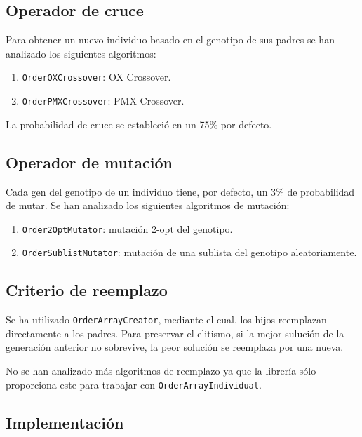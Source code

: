 \documentclass[a4paper,12pt,titlepage]{article}
\begin{document}
\subsection{Operador de cruce}

Para obtener un nuevo individuo basado en el genotipo de sus padres se han analizado los siguientes algoritmos:

\begin{enumerate}[noitemsep]
	\item \lstinline|OrderOXCrossover|: OX Crossover. 
	\item \lstinline|OrderPMXCrossover|: PMX Crossover.
\end{enumerate}

La probabilidad de cruce se estableció en un 75\% por defecto.

\subsection{Operador de mutación}

Cada gen del genotipo de un individuo tiene, por defecto, un 3\% de probabilidad de mutar. Se han analizado los siguientes algoritmos de mutación:

\begin{enumerate}[noitemsep]
	\item \lstinline|Order2OptMutator|: mutación 2-opt del genotipo.
	\item \lstinline|OrderSublistMutator|: mutación de una sublista del genotipo aleatoriamente.
\end{enumerate}

\subsection{Criterio de reemplazo}

Se ha utilizado \lstinline|OrderArrayCreator|, mediante el cual, los hijos reemplazan directamente a los padres. Para preservar el elitismo, si la mejor sulución de la generación anterior no sobrevive, la peor solución se reemplaza por una nueva.

No se han analizado más algoritmos de reemplazo ya que la librería sólo proporciona este para trabajar con \lstinline|OrderArrayIndividual|.

\subsection{Implementación}
\end{document}
